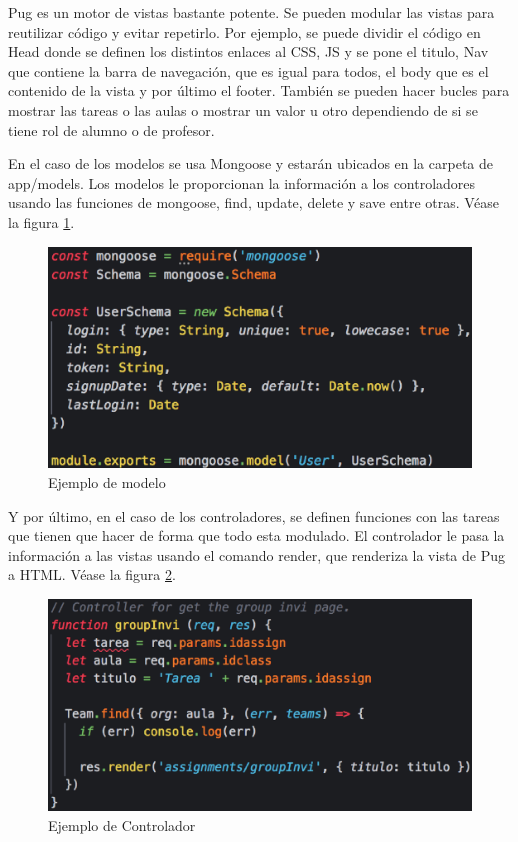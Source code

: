 Pug es un motor de vistas bastante potente. Se pueden modular las vistas para reutilizar código y evitar repetirlo.
Por ejemplo, se puede dividir el código en Head donde se definen los distintos enlaces al CSS, JS y se pone el titulo, 
Nav que contiene la barra de navegación, que es igual para todos, el body que es el contenido de la vista y por último el footer.
También se pueden hacer bucles para mostrar las tareas o las aulas o mostrar un valor u otro dependiendo de si se tiene rol de alumno o de profesor.

\newpage

En el caso de los modelos se usa Mongoose y estarán ubicados en la carpeta de app/models. Los modelos le proporcionan la información a los controladores usando las funciones de mongoose, find, update, delete y save entre otras.
Véase la figura \ref{fig:Ejemplo de modelo}.

\begin{figure}[!th]
\begin{center}
\includegraphics[scale=0.5]{images/modelo}
\caption{Ejemplo de modelo}
\label{fig:Ejemplo de modelo}
\end{center}
\end{figure}

Y por último, en el caso de los controladores, se definen funciones con las tareas que tienen que hacer
de forma que todo esta modulado. El controlador le pasa la información a las vistas usando el comando render, que renderiza la vista de Pug a HTML.
Véase la figura \ref{fig:Ejemplo de Controlador}.

\begin{figure}[!th]
\begin{center}
\includegraphics[scale=0.5]{images/controlador}
\caption{Ejemplo de Controlador}
\label{fig:Ejemplo de Controlador}
\end{center}
\end{figure}

